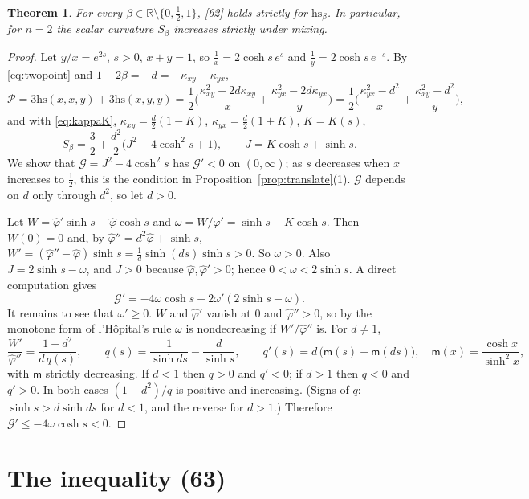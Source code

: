 \documentclass[11pt]{amsart}
\newtheorem{theorem}{Theorem}[section]
\theoremstyle{definition}
\numberwithin{equation}{section}
\newcommand{\R}{\mathbb{R}}
\newcommand{\hs}{\mathrm{hs}}
\newcommand{\ph}{\hat\varphi}
\begin{document}
\begin{theorem}\label{thm:62}
For every $\beta\in\R\setminus\{0,\frac12,1\}$, \eqref{62} holds strictly for $\hs_\beta$. In particular, for $n=2$ the scalar curvature $S_\beta$ increases strictly under mixing.
\end{theorem}
\begin{proof}
Let $y/x=e^{2s}$, $s>0$, $x+y=1$, so $\frac1x=2\cosh s\,e^{s}$ and $\frac1y=2\cosh s\,e^{-s}$. By \eqref{eq:twopoint} and $1-2\beta=-d=-\kappa_{xy}-\kappa_{yx}$,
\[\mathcal P=3\hs(x,x,y)+3\hs(x,y,y)=\frac12\Big(\frac{\kappa_{xy}^2-2d\kappa_{xy}}x+\frac{\kappa_{yx}^2-2d\kappa_{yx}}y\Big)=\frac12\Big(\frac{\kappa_{yx}^2-d^2}x+\frac{\kappa_{xy}^2-d^2}y\Big),\]
and with \eqref{eq:kappaK}, $\kappa_{xy}=\frac d2(1-K)$, $\kappa_{yx}=\frac d2(1+K)$, $K=K(s)$,
\begin{equation}\label{eq:S2}
S_\beta=\frac32+\frac{d^2}2\big(J^2-4\cosh^2s+1\big),\qquad J=K\cosh s+\sinh s .
\end{equation}
We show that $\mathcal G=J^2-4\cosh^2s$ has $\mathcal G'<0$ on $(0,\infty)$; as $s$ decreases when $x$ increases to $\frac12$, this is the condition in Proposition~\ref{prop:translate}(1). $\mathcal G$ depends on $d$ only
through $d^2$, so let $d>0$.

Let $W=\ph'\sinh s-\ph\cosh s$ and $\omega=W/\ph'=\sinh s-K\cosh s$. Then $W(0)=0$ and, by $\ph''=d^2\ph+\sinh s$, $W'=(\ph''-\ph)\sinh s=\frac1d\sinh(ds)\sinh s>0$. So $\omega>0$. Also $J=2\sinh s-\omega$, and
$J>0$ because $\ph,\ph'>0$; hence $0<\omega<2\sinh s$. A direct computation gives
\[\mathcal G'=-4\omega\cosh s-2\omega'(2\sinh s-\omega).\]
It remains to see that $\omega'\ge0$. $W$ and $\ph'$ vanish at $0$ and $\ph''>0$, so by the monotone form of l'H\^opital's rule $\omega$ is nondecreasing if $W'/\ph''$ is. For $d\ne1$,
\[\frac{W'}{\ph''}=\frac{1-d^2}{d\,q(s)},\qquad q(s)=\frac1{\sinh ds}-\frac d{\sinh s},\qquad q'(s)=d\,\big(\mathsf m(s)-\mathsf m(ds)\big),\quad \mathsf m(x)=\frac{\cosh x}{\sinh^2x},\]
with $\mathsf m$ strictly decreasing. If $d<1$ then $q>0$ and $q'<0$; if $d>1$ then $q<0$ and $q'>0$. In both cases $(1-d^2)/q$ is positive and increasing. (Signs of $q$: $\sinh s>d\sinh ds$ for $d<1$, and
the reverse for $d>1$.) Therefore $\mathcal G'\le-4\omega\cosh s<0$.
\end{proof}

\section{The inequality (63)}
\end{document}

